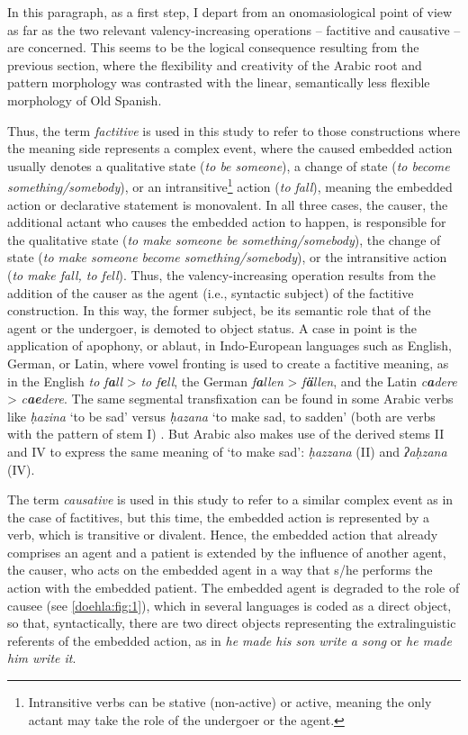 \documentclass[output=paper]{langscibook}
\begin{document}
In this paragraph, as a first step, I depart from an onomasiological point of view as far as the two relevant valency-increasing operations – factitive and causative – are concerned. This seems to be the logical consequence resulting from the previous section, where the flexibility and creativity of the Arabic root and pattern morphology was contrasted with the linear, semantically less flexible morphology of Old Spanish. 

Thus, the term \textit{factitive} is used in this study to refer to those constructions where the meaning side represents a complex event, where the caused embedded action usually denotes a qualitative state (\textit{to be someone}), a change of state (\textit{to become something/somebody}), or an intransitive\footnote{Intransitive verbs can be stative (non-active) or active, meaning the only actant may take the role of the undergoer or the agent.} action (\textit{to fall}), meaning the embedded action or declarative statement is monovalent. In all three cases, the causer, the additional actant who causes the embedded action to happen, is responsible for the qualitative state (\textit{to make someone be something/somebody}), the change of state (\textit{to make someone become something/somebody}), or the intransitive action (\textit{to make fall, to fell}). Thus, the valency-increasing operation results from the addition of the causer as the agent (i.e., syntactic subject) of the factitive construction. In this way, the former subject, be its semantic role that of the agent or the undergoer, is demoted to object status. A case in point is the application of apophony, or ablaut, in Indo-European languages such as English, German, or Latin, where vowel fronting is used to create a factitive meaning, as in the English \textit{to f\textbf{a}ll} > \textit{to f\textbf{e}ll}, the German \textit{f\textbf{a}llen} > \textit{f\textbf{ä}llen}, and the Latin \textit{c\textbf{a}dere} > \textit{c\textbf{ae}dere}. The same segmental transfixation can be found in some Arabic verbs like \textit{ḥazina} ‘to be sad’ versus \textit{ḥazana} ‘to make sad, to sadden’ (both are verbs with the pattern of stem I) \citep[174]{wehr_dictionary_1976}. But Arabic also makes use of the derived stems II and IV to express the same meaning of ‘to make sad’: \textit{ḥazzana} (II) and \textit{ʔaḥzana} (IV). 

The term \textit{causative} is used in this study to refer to a similar complex event as in the case of factitives, but this time, the embedded action is represented by a verb, which is transitive or divalent. Hence, the embedded action that already comprises an agent and a patient is extended by the influence of another agent, the causer, who acts on the embedded agent in a way that s/he performs the action with the embedded patient. The embedded agent is degraded to the role of causee (see \autoref{doehla:fig:1}), which in several languages is coded as a direct object, so that, syntactically, there are two direct objects representing the extralinguistic referents of the embedded action, as in \textit{he made his son write a song} or \textit{he made him write it}.
\end{document}
